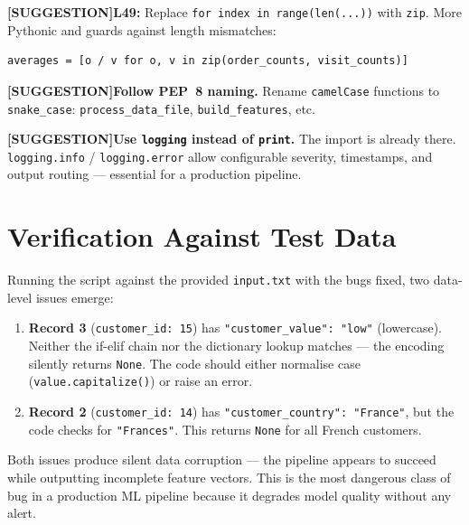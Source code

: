 \documentclass{article}
\newcommand{\lineno}[1]{\textbf{L#1:} }
\newcommand{\suggestion}{\textcolor{suggblue}{\textbf{[SUGGESTION]}}\space}
\begin{document}
\begin{suggbox}
\suggestion \lineno{49} Replace \texttt{for index in range(len(...))} with \texttt{zip}. More Pythonic and guards against length mismatches:
\begin{lstlisting}[numbers=none]
averages = [o / v for o, v in zip(order_counts, visit_counts)]
\end{lstlisting}
\end{suggbox}

\begin{suggbox}
\suggestion \textbf{Follow PEP~8 naming.} Rename \texttt{camelCase} functions to \texttt{snake\_case}: \texttt{process\_data\_file}, \texttt{build\_features}, etc.
\end{suggbox}

\begin{suggbox}
\suggestion \textbf{Use \texttt{logging} instead of \texttt{print}.} The import is already there. \texttt{logging.info} / \texttt{logging.error} allow configurable severity, timestamps, and output routing --- essential for a production pipeline.
\end{suggbox}

\section{Verification Against Test Data}

Running the script against the provided \texttt{input.txt} with the bugs fixed, two data-level issues emerge:

\begin{enumerate}[leftmargin=1.5em, itemsep=3pt]
\item \textbf{Record 3} (\texttt{customer\_id: 15}) has \texttt{"customer\_value": "low"} (lowercase). Neither the if-elif chain nor the dictionary lookup matches --- the encoding silently returns \texttt{None}. The code should either normalise case (\texttt{value.capitalize()}) or raise an error.
\item \textbf{Record 2} (\texttt{customer\_id: 14}) has \texttt{"customer\_country": "France"}, but the code checks for \texttt{"Frances"}. This returns \texttt{None} for all French customers.
\end{enumerate}

Both issues produce silent data corruption --- the pipeline appears to succeed while outputting incomplete feature vectors. This is the most dangerous class of bug in a production ML pipeline because it degrades model quality without any alert.
\end{document}
